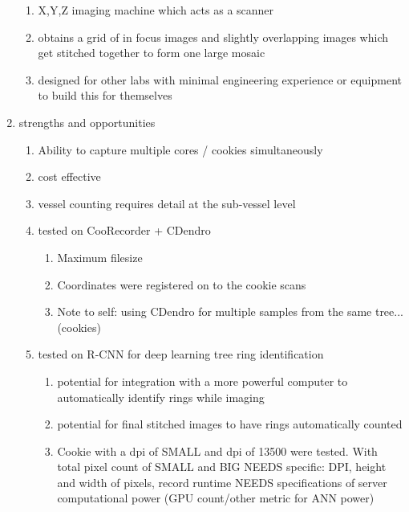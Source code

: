\documentclass{article}
\begin{document}
\begin{outline}[enumerate]
\begin{enumerate}
		\begin{enumerate}
		\item X,Y,Z imaging machine which acts as a scanner 
		\item obtains a grid of in focus images and slightly overlapping images which get stitched together to form one large mosaic 
		\item designed for other labs with minimal engineering experience or equipment to build this for themselves
		\end{enumerate}
	\item strengths and opportunities
		\begin{enumerate} %
		\item Ability to capture multiple cores / cookies simultaneously
		\item cost effective
		\item vessel counting requires detail at the sub-vessel level %
		\item tested on CooRecorder + CDendro
			\begin{enumerate}
			\item Maximum filesize 
			\item Coordinates were registered on to the cookie scans 
			\item Note to self: using CDendro for multiple samples from the same tree... (cookies) 
			\end{enumerate}
		\item tested on R-CNN for deep learning tree ring identification
			\begin{enumerate}
			\item potential for integration with a more powerful computer to automatically identify rings while imaging
			\item potential for final stitched images to have rings automatically counted
			\item Cookie with a dpi of SMALL and dpi of 13500 were tested. With total pixel count of SMALL and BIG
				\subitem NEEDS specific: DPI, height and width of pixels, record runtime
				\subitem NEEDS specifications of server computational power (GPU count/other metric for ANN power)
			\end{enumerate}

\end{enumerate}
\end{enumerate}
\end{outline}
\end{document}
